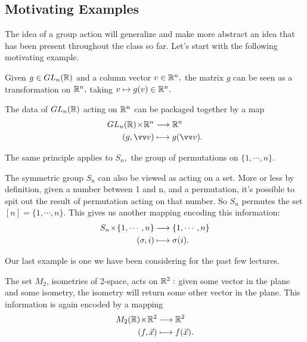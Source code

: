 \subsection{Motivating Examples}
The idea of a group action will generalize and make more abstract an idea that has been present throughout the class so far. Let's start with the following motivating example. 
\begin{example}[$GL_n$]
Given $g \in GL_n(\mathbb R)$ and a column vector $v \in \mathbb R^n,$ the matrix $g$ can be seen as a transformation on $\mathbb R^n,$ taking $v \mapsto g(v) \in \mathbb R^n.$ 

The data of $GL_n(\mathbb R)$ acting on $\mathbb R^n$ can be packaged together by a map 
\begin{align*}
    GL_n(\RR) \by \RR^n &\rto \RR^n \\
    (g, \vvv) &\mto g(\vvv).
\end{align*}
\end{example}

The same principle applies to $S_n,$ the group of permutations on $\{1, \cdots, n\}$.
\begin{example}[$S_n$]
The symmetric group $S_n$ can also be viewed as acting on a set. More or less by definition, given a number between 1 and n, and a permutation, it's possible to spit out the result of permutation acting on that number. So $S_n$ permutes the set $[n] = \{1, \cdots, n\}.$
This gives us another mapping encoding this information:
\begin{align*}
    S_n \hspace{0.05em}{\times}\hspace{0.05em} \{1, \cdots, n\} &\longrightarrow \{1, \cdots, n\} \\
    (\sigma, i) &\longmapsto \sigma(i).
\end{align*} 
\end{example}

Our last example is one we have been considering for the past few lectures.
\begin{example}
The set $M_2$, isometries of 2-space, acts on $\mathbb R^2:$ given some vector in the plane and some isometry, the isometry will return some other vector in the plane. This information is again encoded by a mapping
\begin{align*}
    M_2(\mathbb R) \hspace{0.05em}{\times}\hspace{0.05em} \mathbb R^2 &\longrightarrow \mathbb R^2 \\
    (f, \vec{x}) &\longmapsto f(\vec{x}). 
\end{align*}
\end{example}


